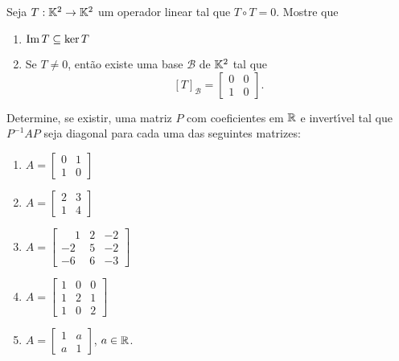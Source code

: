 \documentclass[12pt]{exam}
\begin{document}
\begin{exercicio}
  Seja $T : \mathbb{K}^2 \to \mathbb{K}^2$ um operador linear tal que $T \circ T = 0$. Mostre que
  \begin{enumerate}[label=({\alph*})]
    \item ${\rm Im\,} T \subseteq \ker T$
    \item Se $T \ne 0$, ent\~ao existe uma base $\mathcal{B}$ de $\mathbb{K}^2$ tal que
    \[
      [T]_\mathcal{B} = \begin{bmatrix} 0 & 0\\ 1 & 0\end{bmatrix}.
    \]
  \end{enumerate}
\end{exercicio}

\begin{exercicio}
  Determine, se existir, uma matriz $P$ com coeficientes em $\mathbb{R}$ e invert{\'\i}vel tal que $P^{-1}AP$ seja diagonal para cada uma das seguintes matrizes:
    \begin{enumerate}[label=({\alph*})]
      \item $A = \begin{bmatrix} 0 & 1\\ 1 & 0\end{bmatrix}$
      \item $A = \begin{bmatrix} 2 & 3\\ 1 & 4\end{bmatrix}$
      \item $A = \begin{bmatrix} \phantom{-} 1 & 2 & -2\\ -2 & 5 & -2\\ -6 & 6 & -3\end{bmatrix}$
      \item $A = \begin{bmatrix} 1 & 0 & 0\\ 1 & 2 & 1\\ 1 & 0 & 2\end{bmatrix}$
      \item $A = \begin{bmatrix} 1 & a \\ a & 1\end{bmatrix}$, $a \in \mathbb{R}$.
    \end{enumerate}
    \begin{solucao}
\end{solucao}
\end{exercicio}
\end{document}
